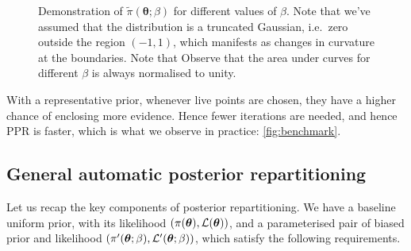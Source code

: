 \documentclass[usenatbib]{mnras}
\begin{document}
\begin{figure}
 
 \caption{\label{org44950de} Demonstration of
   \(\tilde{\pi}(\bm{\theta}; \beta)\) for different values of
   \(\beta\). Note that we've assumed that the distribution is a
   truncated Gaussian, i.e.~zero outside the region \((-1, 1)\), which
   manifests as changes in curvature at the boundaries. Note that
   Observe that the area under curves for different $\beta$ is always
   normalised to unity. }
\end{figure}

With a representative prior, whenever live points are chosen, they
have a higher chance of enclosing more evidence. Hence fewer
iterations are needed, and hence PPR is faster, which is what we
observe in practice: \cref{fig:benchmark}.

\subsection{General automatic posterior repartitioning}

Let us recap the key components of posterior repartitioning. We
have a baseline uniform prior, with its likelihood \((\pi(\bm{\theta}),
   \cal L (\bm{\theta}))\), and a parameterised pair of biased prior and
likelihood \((\pi'(\bm{\theta}; \beta), \cal L' (\bm{\theta}; \beta))\), which
satisfy the following requirements.

\end{document}

